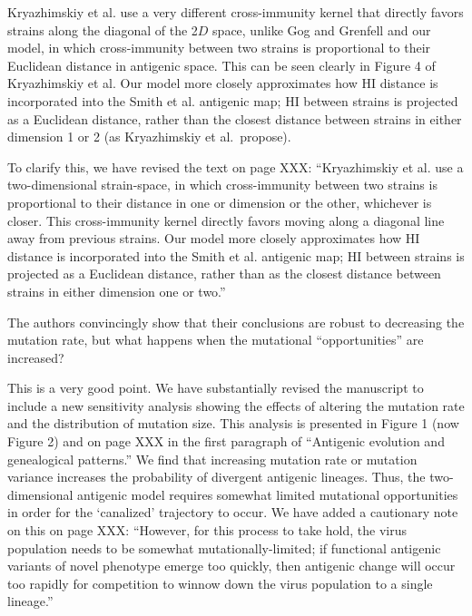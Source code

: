 \documentclass[11pt,oneside,letterpaper]{article}
\def\comment#1{
#1
}
\def\response#1{
\begin{bf}
#1
\end{bf}
}
\def\break{\vspace{0.2cm}}
\begin{document}
\response{Kryazhimskiy et al. \cite{Kryazhimskiy07} use a very different cross-immunity kernel that directly favors strains along the diagonal of the 2$D$ space, unlike Gog and Grenfell \cite{Gog02} and our model, in which cross-immunity between two strains is proportional to their Euclidean distance in antigenic space.  This can be seen clearly in Figure 4 of Kryazhimskiy et al.  Our model more closely approximates how HI distance is incorporated into the Smith et al. \cite{Smith04} antigenic map; HI between strains is projected as a Euclidean distance, rather than the closest distance between strains in either dimension 1 or 2 (as Kryazhimskiy et al.\ propose).}

\response{To clarify this, we have revised the text on page XXX: ``Kryazhimskiy et al. \cite{Kryazhimskiy07} use a two-dimensional strain-space, in which cross-immunity between two strains is proportional to their distance in one or dimension or the other, whichever is closer.  This cross-immunity kernel directly favors moving along a diagonal line away from previous strains.  Our model more closely approximates how HI distance is incorporated into the Smith et al. \cite{Smith04} antigenic map; HI between strains is projected as a Euclidean distance, rather than as the closest distance between strains in either dimension one or two.''}

\break

\comment{The authors convincingly show that their conclusions are robust to decreasing the mutation rate, but what happens when the mutational ``opportunities'' are increased?}

\response{This is a very good point.  We have substantially revised the manuscript to include a new sensitivity analysis showing the effects of altering the mutation rate and the distribution of mutation size.  This analysis is presented in Figure 1 (now Figure 2) and on page XXX in the first paragraph of ``Antigenic evolution and genealogical patterns.'' We find that increasing mutation rate or mutation variance increases the probability of divergent antigenic lineages.  Thus, the two-dimensional antigenic model requires somewhat limited mutational opportunities in order for the `canalized' trajectory to occur.  We have added a cautionary note on this on page XXX: ``However, for this process to take hold, the virus population needs to be somewhat mutationally-limited; if functional antigenic variants of novel phenotype emerge too quickly, then antigenic change will occur too rapidly for competition to winnow down the virus population to a single lineage.''}
\end{document}
